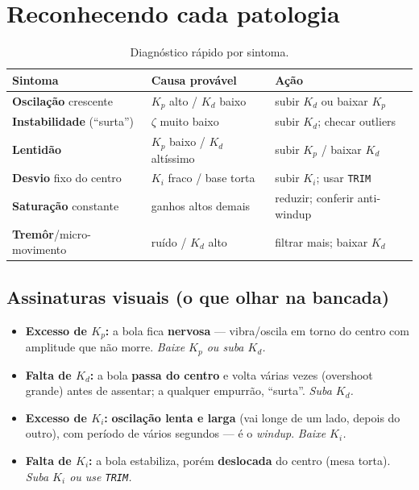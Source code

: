 \section{Reconhecendo cada patologia}
\begin{table}[h]\centering
\caption{Diagn\'ostico r\'apido por sintoma.}
\label{tab:diag}
\small
\begin{tabularx}{\textwidth}{l X l}
\toprule
Sintoma & Causa prov\'avel & A\c{c}\~ao \\
\midrule
\textbf{Oscila\c{c}\~ao} crescente & $K_p$ alto / $K_d$ baixo & subir $K_d$ ou baixar $K_p$ \\
\textbf{Instabilidade} (``surta'') & $\zeta$ muito baixo & subir $K_d$; checar outliers \\
\textbf{Lentid\~ao} & $K_p$ baixo / $K_d$ alt\'issimo & subir $K_p$ / baixar $K_d$ \\
\textbf{Desvio} fixo do centro & $K_i$ fraco / base torta & subir $K_i$; usar \texttt{TRIM} \\
\textbf{Satura\c{c}\~ao} constante & ganhos altos demais & reduzir; conferir anti-windup \\
\textbf{Trem\^or}/micro-movimento & ru\'ido / $K_d$ alto & filtrar mais; baixar $K_d$ \\
\bottomrule
\end{tabularx}
\end{table}

\subsection{Assinaturas visuais (o que olhar na bancada)}
\begin{itemize}[leftmargin=1.4em]
  \item \textbf{Excesso de $K_p$:} a bola fica \textbf{nervosa} --- vibra/oscila em
  torno do centro com amplitude que n\~ao morre. \emph{Baixe $K_p$ ou suba $K_d$.}
  \item \textbf{Falta de $K_d$:} a bola \textbf{passa do centro} e volta v\'arias
  vezes (overshoot grande) antes de assentar; a qualquer empurr\~ao, ``surta''.
  \emph{Suba $K_d$.}
  \item \textbf{Excesso de $K_i$:} \textbf{oscila\c{c}\~ao lenta e larga} (vai longe
  de um lado, depois do outro), com per\'iodo de v\'arios segundos --- \'e o
  \emph{windup}. \emph{Baixe $K_i$.}
  \item \textbf{Falta de $K_i$:} a bola estabiliza, por\'em \textbf{deslocada} do
  centro (mesa torta). \emph{Suba $K_i$ ou use \texttt{TRIM}.}
\end{itemize}

